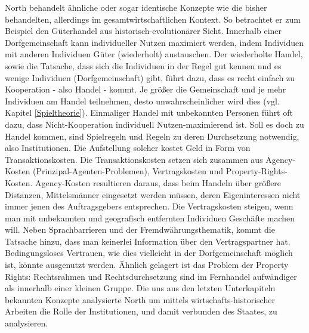 North behandelt ähnliche oder sogar identische Konzepte wie die bisher behandelten, allerdings im gesamtwirtschaftlichen Kontext. So betrachtet er zum Beispiel den Güterhandel aus historisch-evolutionärer Sicht. Innerhalb einer Dorfgemeinschaft kann individueller Nutzen maximiert werden, indem Individuen mit anderen Individuen Güter (wiederholt) austauschen. Der wiederholte Handel, sowie die Tatsache, dass sich die Individuen in der Regel gut kennen und es wenige Individuen (Dorfgemeinschaft) gibt, führt dazu, dass es recht einfach zu Kooperation - also Handel - kommt. Je größer die Gemeinschaft und je mehr Individuen am Handel teilnehmen, desto unwahrscheinlicher wird dies (vgl. Kapitel \ref{Spieltheorie}). Einmaliger Handel mit unbekannten Personen führt oft dazu, dass Nicht-Kooperation individuell Nutzen-maximierend ist. Soll es doch zu Handel kommen, sind Spielregeln und Regeln zu deren Durchsetzung notwendig, also Institutionen. Die Aufstellung solcher kostet Geld in Form von Transaktionskosten. Die Transaktionskosten setzen sich zusammen aus Agency-Kosten (Prinzipal-Agenten-Problemen), Vertragskosten und Property-Rights-Kosten. Agency-Kosten resultieren daraus, dass beim Handeln über größere Distanzen, Mittelsmänner eingesetzt werden müssen, deren Eigeninteressen nicht immer jenen des Auftragsgebers entsprechen. Die Vertragskosten steigen, wenn man mit unbekannten und geografisch entfernten Individuen Geschäfte machen will. Neben Sprachbarrieren und der Fremdwährungsthematik, kommt die Tatsache hinzu, dass man keinerlei Information über den Vertragspartner hat. Bedingungsloses Vertrauen, wie dies vielleicht in der Dorfgemeinschaft möglich ist, könnte ausgenutzt werden. Ähnlich gelagert ist das Problem der Property Rights: Rechtsrahmen und Rechtsdurchsetzung sind im Fernhandel aufwändiger als innerhalb einer kleinen Gruppe. Die uns aus den letzten Unterkapiteln bekannten Konzepte analysierte North um mittels wirtschafts-historischer Arbeiten die Rolle der Institutionen, und damit verbunden des Staates, zu analysieren. 


